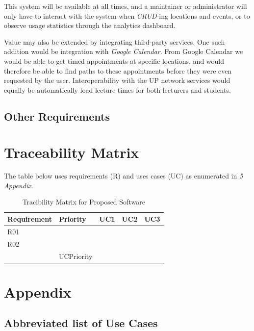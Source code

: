\documentclass[12pt,a4paper]{article}
\begin{document}
			This system will be available at all times, and a maintainer or
			administrator will only have to interact with the system when
			\textit{CRUD}-ing locations and events, or to observe usage statistics
			through the analytics dashboard.

			\medskip

			Value may also be extended by integrating third-party services. One such
			addition would be integration with \textit{Google Calendar}. From Google
			Calendar we would be able to get timed appointments at specific locations,
			and would therefore be able to find paths to these appointments before
			they were even requested by the user. Interoperability with the UP network
			services would equally be automatically load lecture times for both
			lecturers and students.

		\subsection{Other Requirements}

	\section{Traceability Matrix}

	The table below uses requirements (R) and uses cases (UC) as enumerated in
	\textit{5 Appendix}.

	\begin{table}[!h]
		\centering
		\caption{Tracibility Matrix for Proposed Software}
		\label{my-label}
		\begin{tabular}{|ll|l|l|l|}
			\hline
			\multicolumn{1}{|l|}{Requirement} & Priority & UC1 & UC2 & UC3 \\ \hline
			\multicolumn{1}{|l|}{R01}            &          &     &     &     \\ \hline
			\multicolumn{1}{|l|}{R02}            &          &     &     &     \\ \hline
														&    UCPriority   &     &     &     \\ \hline
		\end{tabular}
	\end{table}

	\pagebreak

	\section{Appendix}

		\subsection{Abbreviated list of Use Cases}
\end{document}
